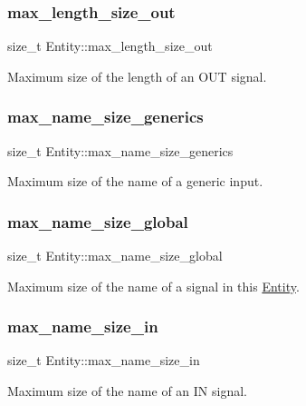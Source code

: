 \subsubsection{\texorpdfstring{max\_length\_size\_out}{max\_length\_size\_out}}
{\footnotesize\ttfamily size\+\_\+t Entity\+::max\+\_\+length\+\_\+size\+\_\+out}

Maximum size of the length of an O\+UT signal. \mbox{\label{struct_entity_a8b0c53c2f6867fd1c011210e63efcaad}} 
\subsubsection{\texorpdfstring{max\_name\_size\_generics}{max\_name\_size\_generics}}
{\footnotesize\ttfamily size\+\_\+t Entity\+::max\+\_\+name\+\_\+size\+\_\+generics}

Maximum size of the name of a generic input. \mbox{\label{struct_entity_a5066a9a519892bae3522583614ad4265}} 
\subsubsection{\texorpdfstring{max\_name\_size\_global}{max\_name\_size\_global}}
{\footnotesize\ttfamily size\+\_\+t Entity\+::max\+\_\+name\+\_\+size\+\_\+global}

Maximum size of the name of a signal in this \mbox{\hyperlink{struct_entity}{Entity}}. \mbox{\label{struct_entity_ae224ddbebe0375e2b802c08ca7f15dda}} 
\subsubsection{\texorpdfstring{max\_name\_size\_in}{max\_name\_size\_in}}
{\footnotesize\ttfamily size\+\_\+t Entity\+::max\+\_\+name\+\_\+size\+\_\+in}

Maximum size of the name of an IN signal. \mbox{\label{struct_entity_a33a2fca24ecaee57aaf1b2416463e1bd}} 
